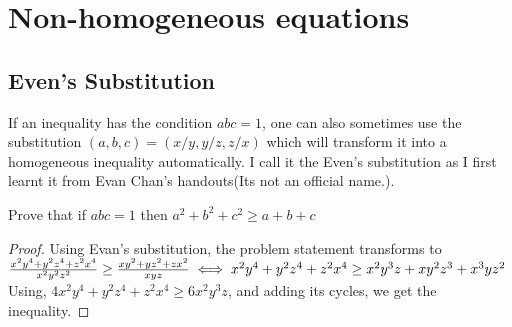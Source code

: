 \section{Non-homogeneous equations}
\subsection{Even's Substitution}
If an inequality has the condition $abc = 1$, one can also sometimes use the substitution $(a, b, c) = (x/y, y/z, z/x)$ which will transform it into a homogeneous inequality automatically. I call it the Even's substitution as I first learnt it from Evan Chan's handouts(Its not an official name.).
\begin{example}
    Prove that if $abc = 1$ then $a^2 + b^2 + c^2 \geq a + b + c$
\end{example}
\begin{proof}
    Using Evan's substitution, the problem statement transforms to
    $\frac{x^2y^4+y^2z^4+z^2x^4}{x^2y^2z^2}\geq \frac{xy^2+yz^2+zx^2}{xyz}\\
    \iff x^2y^4+y^2z^4+z^2x^4 \geq x^2y^3z + xy^2z^3 + x^3yz^2$\\
    Using, $4x^2y^4+y^2z^4+z^2x^4 \geq 6x^2y^3z$, and adding its cycles, we get the inequality.
\end{proof}
